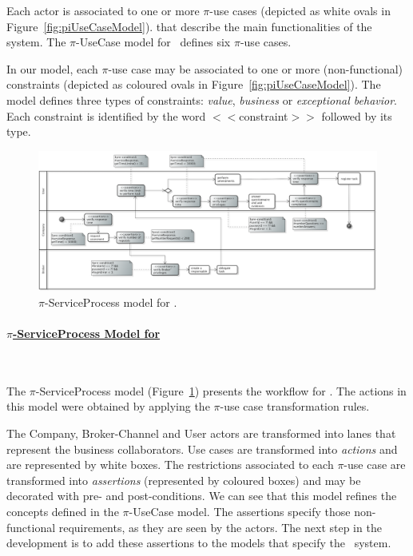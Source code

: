 Each actor is associated to one or more $\pi$-use cases (depicted as white ovals in Figure~\ref{fig:piUseCaseModel}). 
that describe the main functionalities of the system.
The $\pi$-UseCase model for \FlyingPig\ defines six $\pi$-use cases. 

In our model, each $\pi$-use case may be associated to one or more (non-functional) constraints (depicted as coloured ovals in Figure~\ref{fig:piUseCaseModel}). 
The model defines three types of constraints: \textit{value}, \textit{business} or \textit{exceptional behavior}. 
Each constraint is identified by the word $<<$\textsf{constraint}$>>$ followed by its type.


\begin{figure}
\centering
\includegraphics[width=1.0\textwidth]{figs/ServiceProcessGeneralCut.png}
\caption{$\pi$-ServiceProcess model for \FlyingPig.\label{fig:PiServiceProcessModel}}
\end{figure}

\paragraph{\underline{$\pi$-ServiceProcess Model for \FlyingPig}}~

The $\pi$-ServiceProcess model (Figure~\ref{fig:PiServiceProcessModel}) presents the workflow for \FlyingPig.
The actions in this model were obtained by applying the $\pi$-use case transformation rules.

The \textsf{Company}, \textsf{Broker-Channel} and \textsf{User} actors are transformed into lanes that represent the business collaborators.
Use cases are transformed into \textit{actions} and are represented by white boxes.
The restrictions associated to each $\pi$-use case are transformed into \textit{assertions} (represented by coloured boxes) and may be decorated with pre- and post-conditions. 
We can see that this model refines the concepts defined in the $\pi$-UseCase model.
The assertions specify those non-functional requirements, as they are seen by the actors. 
The next step in the development is to add these assertions to the models that specify the \FlyingPig\ system.

